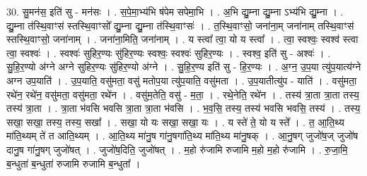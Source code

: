 \documentclass[17pt]{extarticle}
\begin{document}
30. सु॒मन॑स॒ इति॑ सु - मन॑सः । . स॒पे॒मा॒भ्य॑भि ष॑पेम सपेमा॒भि । . अ॒भि द्यु॒म्ना द्यु॒म्ना ऽभ्य॑भि द्यु॒म्ना । . द्यु॒म्ना त॑स्थि॒वाꣳस॑ स्तस्थि॒वाꣳसो᳚ द्यु॒म्ना द्यु॒म्ना त॑स्थि॒वाꣳसः॑ । . त॒स्थि॒वाꣳसो॒ जना॑ना॒म् जना॑नाम् तस्थि॒वाꣳस॑ स्तस्थि॒वाꣳसो॒ जना॑नाम् । . जना॑ना॒मिति॒ जना॑नाम् । . य स्त्वा᳚ त्वा॒ यो य स्त्वा᳚ । . त्वा॒ स्वश्वः॒ स्वश्व॑ स्त्वा त्वा॒ स्वश्वः॑ । . स्वश्वः॑ सुहिर॒ण्यः सु॑हिर॒ण्यः स्वश्वः॒ स्वश्वः॑ सुहिर॒ण्यः । . स्वश्व॒ इति॑ सु - अश्वः॑ । . सु॒हि॒र॒ण्यो अ॑ग्ने अग्ने सुहिर॒ण्यः सु॑हिर॒ण्यो अ॑ग्ने । . सु॒हि॒र॒ण्य इति॑ सु - हि॒र॒ण्यः । . अ॒ग्न॒ उ॒प॒या त्यु॑प॒यात्य॑ग्ने अग्न उप॒याति॑ । . उ॒प॒याति॒ वसु॑मता॒ वसु॑ मतोप॒या त्यु॑प॒याति॒ वसु॑मता । . उ॒प॒यातीत्यु॑प - याति॑ । . वसु॑मता॒ रथे॑न॒ रथे॑न॒ वसु॑मता॒ वसु॑मता॒ रथे॑न । . वसु॑म॒तेति॒ वसु॑ - म॒ता॒ । . रथे॒नेति॒ रथे॑न । . तस्य॑ त्रा॒ता त्रा॒ता तस्य॒ तस्य॑ त्रा॒ता । . त्रा॒ता भ॑वसि भवसि त्रा॒ता त्रा॒ता भ॑वसि । . भ॒व॒सि॒ तस्य॒ तस्य॑ भवसि भवसि॒ तस्य॑ । . तस्य॒ सखा॒ सखा॒ तस्य॒ तस्य॒ सखा᳚ । . सखा॒ यो यः सखा॒ सखा॒ यः । . य स्ते॑ ते॒ यो य स्ते᳚ । . त॒ आ॒ति॒थ्य मा॑ति॒थ्यम् ते॑ त आति॒थ्यम् । . आ॒ति॒थ्य मा॑नु॒ष गा॑नु॒षगा॑ति॒थ्य मा॑ति॒थ्य मा॑नु॒षक् । . आ॒नु॒षग् जुजो॑ष॒ज् जुजो॑ष दानु॒ष गा॑नु॒षग् जुजो॑षत् । . जुजो॑ष॒दिति॒ जुजो॑षत् । . म॒हो रु॑जामि रुजामि म॒हो म॒हो रु॑जामि । . रु॒जा॒मि॒ ब॒न्धुता॑ ब॒न्धुता॑ रुजामि रुजामि ब॒न्धुता᳚ । \newline
\end{document}
